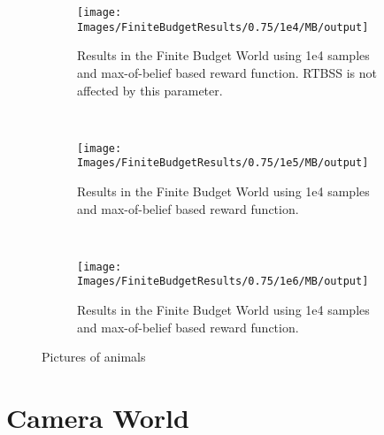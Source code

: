 \begin{figure}[h]
        \centering
        \begin{subfigure}[t]{0.3\textwidth}
                \texttt{[image: Images/FiniteBudgetResults/0.75/1e4/MB/output]}
                \caption{Results in the Finite Budget World using 1e4 samples and max-of-belief based
                reward function. RTBSS is not affected by this parameter.}
                \label{fig:m4m}
        \end{subfigure}%
        ~ %
        \begin{subfigure}[t]{0.3\textwidth}
                \texttt{[image: Images/FiniteBudgetResults/0.75/1e5/MB/output]}
                \caption{Results in the Finite Budget World using 1e4 samples and max-of-belief based
                reward function.}
                \label{fig:m5m}
        \end{subfigure}
        ~ %
        \begin{subfigure}[t]{0.3\textwidth}
                \texttt{[image: Images/FiniteBudgetResults/0.75/1e6/MB/output]}
                \caption{Results in the Finite Budget World using 1e4 samples and max-of-belief based
                reward function.}
                \label{fig:m6m}
        \end{subfigure}
        \caption{Pictures of animals}\label{fig:mm}
\end{figure}

\clearpage
\section{Camera World}

